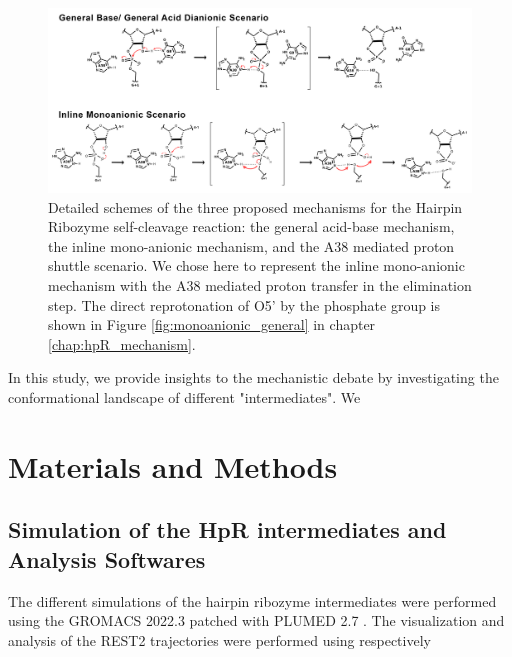 \documentclass[journal=jacsat,manuscript=article]{achemso}
\begin{document}
\begin{figure}[h]
  \centering
  \includegraphics[width=\textwidth]{figures/All_mecanisms.png}
  \caption[Mechanistic Pathways of the Self-Cleavage]
  {Detailed schemes of the three proposed mechanisms for the Hairpin Ribozyme self-cleavage reaction:
  the general acid-base mechanism, the inline mono-anionic mechanism, and the A38 mediated proton shuttle scenario.
  We chose here to represent the inline mono-anionic mechanism with the A38 mediated proton transfer in the elimination step. 
  The direct reprotonation of O5' by the phosphate group is shown in Figure \ref{fig:monoanionic_general} in chapter \ref{chap:hpR_mechanism}.}
  \label{fig:all_mecas}
\end{figure}




In this study, we provide insights to the mechanistic debate by investigating the conformational landscape of different "intermediates".
We 






\section{Materials and Methods}

\subsection{Simulation of the HpR intermediates and Analysis Softwares}

The different simulations of the hairpin ribozyme intermediates were performed using the GROMACS 2022.3 \cite{abraham_gromacs_2015} patched with PLUMED 2.7 \cite{tribello_plumed_2014, the_plumed_consortium_promoting_2019}.
The visualization and analysis of the REST2 trajectories were performed using respectively 
\end{document}
